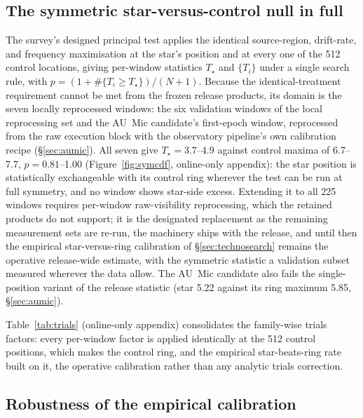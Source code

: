 \documentclass{openjournal}
\begin{document}
\subsection*{The symmetric star-versus-control null in full}

The survey's designed principal test applies the identical
source-region, drift-rate, and frequency maximisation at the star's
position and at every one of the 512 control locations, giving
per-window statistics $T_\star$ and $\{T_i\}$ under a single search
rule, with $p = (1+\#\{T_i\geq T_\star\})/(N+1)$. Because the
identical-treatment requirement cannot be met from the frozen release
products, its domain is the seven locally reprocessed windows: the
six validation windows of the local reprocessing set and the AU~Mic
candidate's first-epoch window, reprocessed from the raw execution
block with the observatory pipeline's own calibration recipe
(\S\ref{sec:aumic}). All seven give $T_\star=3.7$--$4.9$ against
control maxima of 6.7--7.7, $p=0.81$--1.00 (Figure~\ref{fig:symcdf},
online-only appendix): the star position is statistically
exchangeable with its control ring wherever the test can be run at
full symmetry, and no window shows star-side excess. Extending it to
all 225 windows requires per-window raw-visibility reprocessing,
which the retained products do not support; it is the designated
replacement as the remaining measurement sets are re-run, the
machinery ships with the release, and until then the
empirical star-versus-ring calibration of
\S\ref{sec:technosearch} remains the operative release-wide estimate,
with the symmetric statistic a validation subset measured wherever the
data allow. The AU~Mic candidate also fails the
single-position variant of the release statistic (star 5.22 against
its ring maximum 5.85, \S\ref{sec:aumic}).

Table~\ref{tab:trials} (online-only appendix) consolidates the
family-wise trials factors: every per-window factor is applied
identically at the 512 control positions, which makes the control
ring, and the empirical star-beats-ring rate built on it, the
operative calibration rather than any analytic trials correction.

\subsection*{Robustness of the empirical calibration}
\end{document}
